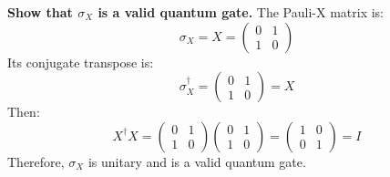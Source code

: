 \newpage

\noindent
\textbf{Show that $\sigma_X$ is a valid quantum gate.} The Pauli-X matrix is:
\begin{equation*}
    \sigma_{X} = X =
    \begin{pmatrix}
        0 & 1 \\
        1 & 0
    \end{pmatrix}
\end{equation*}
Its conjugate transpose is:
\begin{equation*}
    \sigma_{X}^{\dagger} =
    \begin{pmatrix}
        0 & 1 \\
        1 & 0
    \end{pmatrix} = X
\end{equation*}
Then:
\begin{equation*}
    X^{\dagger}X =
    \begin{pmatrix}
        0 & 1 \\
        1 & 0
    \end{pmatrix}
    \begin{pmatrix}
        0 & 1 \\
        1 & 0
    \end{pmatrix}
    =
    \begin{pmatrix}
        1 & 0 \\
        0 & 1
    \end{pmatrix}
    = I
\end{equation*}
Therefore, $\sigma_X$ is unitary and is a valid quantum gate.

